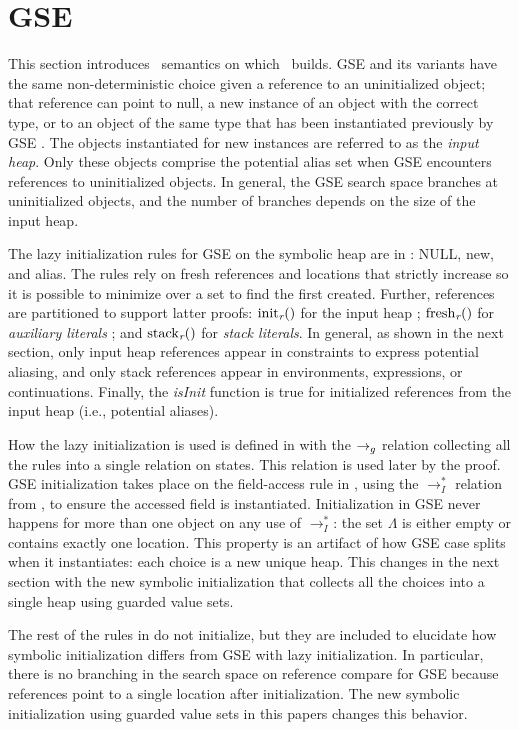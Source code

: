 \section{GSE}
\label{app:gse}
This section introduces \gsetxt\ semantics on which \symtxt\ builds. GSE and its variants have the same non-deterministic choice given a reference to an uninitialized object; that reference can point to null, a new instance of an object with the correct type, or to an object of the same type that has been instantiated previously by GSE \cite{GSE03,KiasanKunit,Cadar:2008,Rosner:2015}. The objects instantiated for new instances are referred to as the \emph{input heap}. Only these objects comprise the potential alias set when GSE encounters references to uninitialized objects. In general, the GSE search space branches at uninitialized objects, and the number of branches depends on the size of the input heap.

The lazy initialization rules for GSE on the symbolic heap are in
: NULL, new, and alias. The rules rely on fresh references and locations that strictly increase so it is possible to minimize over a set to find the first created. Further, references are partitioned to support latter proofs: $\mathrm{init}_{\emph{r}}()$ for the input
  heap
  ; $\mathrm{fresh}_{\emph{r}}()$ for \emph{auxiliary
  literals}
  ; and $\mathrm{stack}_{\emph{r}}()$ for \emph{stack
    literals}.
  In general, as shown in the next section,
  only input heap references appear in constraints to express potential aliasing, and only stack references appear in environments, expressions, or continuations.  Finally, the \emph{isInit} function is true for initialized references from the input heap (i.e., potential aliases). 

How the lazy
initialization is used is defined in  with the $\rightarrow_{g}$ relation collecting all the rules into a single relation on states. This relation is used later by the proof. GSE initialization takes place on the field-access rule in ,
using the $\rightarrow_I^*$ relation from , to ensure the accessed field is
instantiated. Initialization in GSE never
happens for more than one object on any use of $\rightarrow_I^*$:
the set $\Lambda$ is either empty or contains exactly one location. This property is an artifact of how GSE case splits when it instantiates: each choice is a new unique heap. This changes in the next section with the new symbolic initialization that collects all the choices into a single heap using guarded value sets.

The rest of the rules in  do not initialize, but they are included to elucidate how symbolic initialization differs from GSE with lazy initialization. In particular, there is no branching in the search space on reference compare for GSE because references point to a single location after initialization. The new symbolic initialization using guarded value sets in this papers changes this behavior. 



